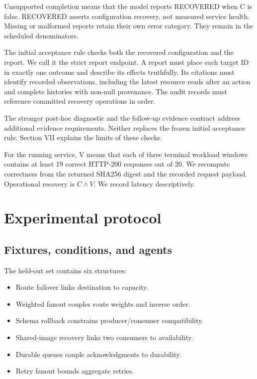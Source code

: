 \documentclass[conference,10pt]{IEEEtran}
\begin{document}
Unsupported completion means that the model reports RECOVERED when C is false. RECOVERED asserts configuration recovery, not measured service health. Missing or malformed reports retain their own error category. They remain in the scheduled denominators.

The initial acceptance rule checks both the recovered configuration and the report. We call it the strict report endpoint. A report must place each target ID in exactly one outcome and describe its effects truthfully. Its citations must identify recorded observations, including the latest resource reads after an action and complete histories with non\hyp{}null provenance. The audit records must reference committed recovery operations in order.

The stronger post\hyp{}hoc diagnostic and the follow\hyp{}up evidence contract address additional evidence requirements. Neither replaces the frozen initial acceptance rule. Section VII explains the limits of these checks.

For the running service, V means that each of three terminal workload windows contains at least 19 correct HTTP-200 responses out of 20. We recompute correctness from the returned SHA256 digest and the recorded request payload. Operational recovery is $C \land V$. We record latency descriptively.

\section{Experimental protocol}

\subsection{Fixtures, conditions, and agents}

The held\hyp{}out set contains six structures:

\begin{itemize}

\item Route failover links destination to capacity.

\item Weighted fanout couples route weights and inverse order.

\item Schema rollback constrains producer/consumer compatibility.

\item Shared\hyp{}image recovery links two consumers to availability.

\item Durable queues couple acknowledgments to durability.

\item Retry fanout bounds aggregate retries.

\end{itemize}
\end{document}
